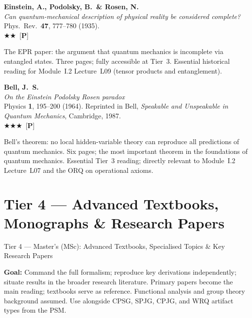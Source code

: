 \documentclass[11pt,a4paper]{article}
\newcommand{\essential}{$\bigstar\bigstar\bigstar$}
\newcommand{\recommended}{$\bigstar\bigstar$}
\newenvironment{bibentry}[1]{\begin{tcolorbox}[entrybox=#1,top=4pt,bottom=4pt]}{\end{tcolorbox}\smallskip}
\begin{document}
\begin{bibentry}{t3light}
\textbf{Einstein, A., Podolsky, B.\ \& Rosen, N.}\\
\textit{Can quantum-mechanical description of physical reality be considered complete?}\\
Phys.~Rev.~\textbf{47}, 777--780 (1935).\\[3pt]
\recommended\ [\textbf{P}]\\[3pt]
\begin{tcolorbox}[annotbox]
The EPR paper: the argument that quantum mechanics is incomplete via entangled states.
Three pages; fully accessible at Tier~3. Essential historical reading for Module~I.2
Lecture~L09 (tensor products and entanglement).
\end{tcolorbox}
\end{bibentry}

\begin{bibentry}{t3light}
\textbf{Bell, J.~S.}\\
\textit{On the Einstein Podolsky Rosen paradox}\\
Physics \textbf{1}, 195--200 (1964). Reprinted in Bell, \textit{Speakable and
Unspeakable in Quantum Mechanics}, Cambridge, 1987.\\[3pt]
\essential\ [\textbf{P}]\\[3pt]
\begin{tcolorbox}[annotbox]
Bell's theorem: no local hidden-variable theory can reproduce all predictions of quantum
mechanics. Six pages; the most important theorem in the foundations of quantum mechanics.
Essential Tier~3 reading; directly relevant to Module~I.2 Lecture~L07 and the ORQ on
operational axioms.
\end{tcolorbox}
\end{bibentry}

\newpage
\section{Tier 4 --- Advanced Textbooks, Monographs \& Research Papers}
\label{sec:t4}

\begin{tcolorbox}[tierheader=t4orange]
Tier 4 --- Master's (MSc): Advanced Textbooks, Specialised Topics \& Key Research Papers
\end{tcolorbox}

\medskip
\begin{tcolorbox}[keybox]
\textbf{Goal:} Command the full formalism; reproduce key derivations independently;
situate results in the broader research literature. Primary papers become the main
reading; textbooks serve as reference. Functional analysis and group theory background
assumed. Use alongside CPSG, SPJG, CPJG, and WRQ artifact types from the PSM.
\end{tcolorbox}
\end{document}
